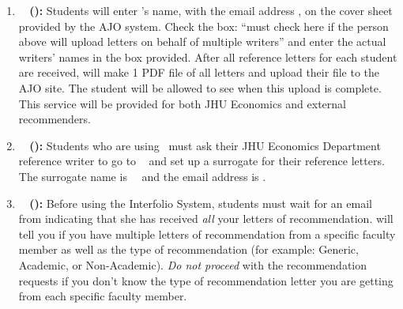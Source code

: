 \documentclass{\classes/econtex}
\begin{document}
\begin{enumerate}
\begin{itemize}
  \end{itemize}

\item \textbf{\AJO ~ (\AJOLink):}
  Students will enter {\JMStaffName}'s name, with the email address \jmstaffemail, on the cover sheet provided by the AJO system. Check the box: ``must check here if the person above will upload letters on behalf of multiple writers'' and enter the actual writers' names in the box provided. After all reference letters for each student are received, {\JMStaffName} will make 1 PDF file of all letters and upload their file to the AJO site. The student will be allowed to see when this upload is complete. This service will be provided for both JHU Economics and external recommenders.

\item \textbf{\AEA ~ (\AEALink):}
  Students who are using \AEA~must ask their JHU Economics Department reference writer to go to \AEARecLink~ and set up a surrogate for their reference letters. The surrogate name is {\JMStaffName}~{\JMStaffNameLast}~and the email address is \jmstaffemail. %

\hypertarget{students-interfolio}{}
\item \textbf{\Interfolio ~ (\InterfolioLink):}
  Before using the Interfolio System, students must wait for an email from {\JMStaffName} indicating that she has received \textit{all} your letters of recommendation. {\JMStaffName} will tell you if you have multiple letters of recommendation from a specific faculty member as well as the type of recommendation (for example: Generic, Academic, or Non-Academic). \textit{Do not proceed} with the recommendation requests if you don't know the type of recommendation letter you are getting from each specific faculty member.


\end{enumerate}
\end{document}
